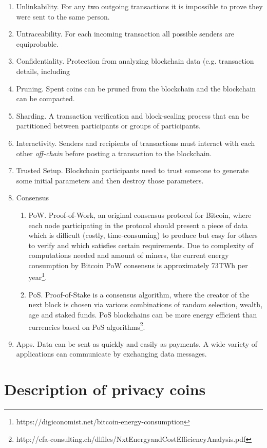 \documentclass[8pt,fleqn,openany]{book}
\begin{document}
{\begin{enumerate}
	\item Unlinkability. For any two outgoing transactions it is impossible to prove they were sent to the same person\cite{c2}.
	\item Untraceability. For each incoming transaction all possible senders are equiprobable\cite{c2}.
	\item Confidentiality. Protection from analyzing blockchain data (e.g. transaction details, including   	\item Pruning. Spent coins can be pruned from the blockchain and the blockchain can be compacted.
	\item Sharding. A transaction verification and block-sealing process that can be partitioned between participants or groups of participants.
	\item Interactivity. Senders and recipients of transactions must interact with each other \textit{off-chain} before posting a transaction to the blockchain.
	\item Trusted Setup. Blockchain participants need to trust someone to generate some initial parameters and then destroy those parameters.
	\item Consensus
	\begin{enumerate}
 		\item PoW. Proof-of-Work, an original consensus protocol for Bitcoin, where each node participating in the protocol should present a piece of data which is difficult (costly, time-consuming) to produce but easy for others to verify and which satisfies certain requirements. Due to complexity of computations needed and amount of miners, the current energy consumption by Bitcoin PoW consensus is approximately 73TWh per year\footnote{https://digiconomist.net/bitcoin-energy-consumption}.
		\item PoS. Proof-of-Stake is a consensus algorithm, where the creator of the next block is chosen via various combinations of random selection, wealth, age and staked funds. PoS blockchains can be more energy efficient than currencies based on PoS algorithms\footnote{http://cfa-consulting.ch/dlfiles/NxtEnergyandCostEfficiencyAnalysis.pdf}.
	\end{enumerate}
	\item Apps. Data can be sent as quickly and easily as payments. A wide variety of applications can communicate by exchanging data messages. 
\end{enumerate}

\section{Description of privacy coins}

}
\end{document}
